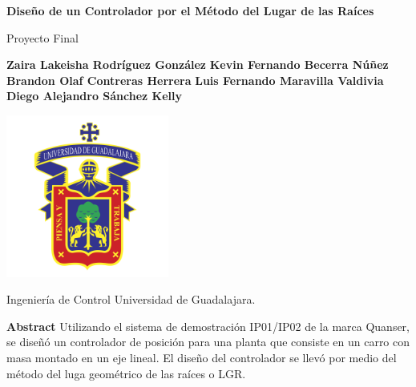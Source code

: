 \documentclass[12pt,a4paper]{article}
\begin{document}
	
	\begin{titlepage}
		\begin{center}
      \vspace{2cm}
      
      \huge
      \textbf{Diseño de un Controlador por el Método del Lugar de las Raíces}
      
      \vspace{.5cm}
      
      \large
      Proyecto Final
      
      \vspace{2cm}

      \small
      \textbf{Zaira Lakeisha Rodríguez González} \break
      \textbf{Kevin Fernando Becerra Núñez} \break
      \textbf{Brandon Olaf Contreras Herrera} \break
      \textbf{Luis Fernando Maravilla Valdivia} \break
      \textbf{Diego Alejandro Sánchez Kelly} \break

      \vspace{1cm}
      
      \includegraphics[width=0.4\textwidth, keepaspectratio]{./Resources/UDG.png}
      
      \vfill
      
      \large
      Ingeniería de Control \break
      Universidad de Guadalajara.

		\end{center}
	\end{titlepage}

	\pagebreak 
	
    \begin{center}
      \textbf{Abstract} \break
      Utilizando el sistema de demostración IP01/IP02 de la marca Quanser, se diseñó un controlador de posición 
      para una planta que consiste en un carro con masa montado en un eje lineal. El diseño del controlador se llevó 
      por medio del método del luga geométrico de las raíces o LGR. 
    \end{center}
\end{document}
